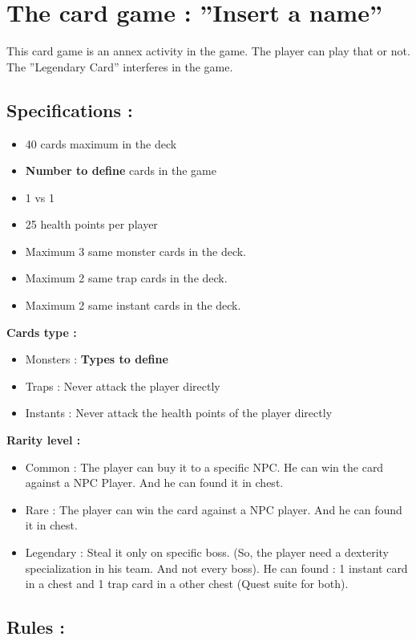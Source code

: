 \documentclass[a4paper,12pt]{book}
\begin{document}
\chapter{The card game : ''Insert a name''}
This card game is an annex activity in the game. The player can play that or not. The ''Legendary Card'' interferes in the game.
\section{Specifications :}
\begin{itemize}
\item 40 cards maximum in the deck
\item \textbf{Number to define} cards in the game
\item 1 vs 1
\item 25 health points per player
\item Maximum 3 same monster cards in the deck.
\item Maximum 2 same trap cards in the deck.
\item Maximum 2 same instant cards in the deck.
\end{itemize}
\textbf{Cards type :}
\begin{itemize}
\item Monsters : \textbf{Types to define}
\item Traps : Never attack the player directly
\item Instants : Never attack the health points of the player directly
\end{itemize}
\textbf{Rarity level :}
\begin{itemize}
\item Common : The player can buy it to a specific NPC. He can win the card against a NPC Player. And he can found it in chest.
\item Rare : The player can win the card against a NPC player. And he can found it in chest.
\item Legendary : Steal it only on specific boss. (So, the player need a dexterity specialization in his team. And not every boss). He can found : 1 instant card in a chest and 1 trap card in a other chest (Quest suite for both).
\end{itemize}

\section{Rules :}
\end{document}
